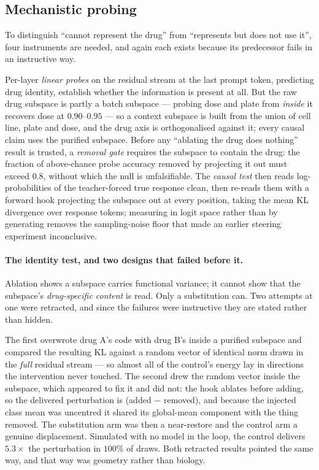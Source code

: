 \subsection{Mechanistic probing}
\label{sec:methods-probe}

To distinguish ``cannot represent the drug'' from ``represents but does not use it'', four
instruments are needed, and again each exists because its predecessor fails in an instructive way.

Per-layer \emph{linear probes} on the residual stream at the last prompt token, predicting drug
identity, establish whether the information is present at all. But the raw drug subspace is partly
a batch subspace --- probing dose and plate from \emph{inside} it recovers dose at $0.90$--$0.95$ ---
so a context subspace is built from the union of cell line, plate and dose, and the drug axis is
orthogonalised against it; every causal claim uses the purified subspace. Before any ``ablating the
drug does nothing'' result is trusted, a \emph{removal gate} requires the subspace to contain the
drug: the fraction of above-chance probe accuracy removed by projecting it out must exceed $0.8$,
without which the null is unfalsifiable. The \emph{causal test} then reads log-probabilities of the
teacher-forced true response clean, then re-reads them with a forward hook projecting the subspace
out at every position, taking the mean KL divergence over response tokens; measuring in logit space
rather than by generating removes the sampling-noise floor that made an earlier steering experiment
inconclusive.

\paragraph{The identity test, and two designs that failed before it.} Ablation shows a subspace
carries functional variance; it cannot show that the subspace's \emph{drug-specific content} is read.
Only a substitution can. Two attempts at one were retracted, and since the failures were instructive
they are stated rather than hidden.

The first overwrote drug A's code with drug B's inside a purified subspace and compared the resulting
KL against a random vector of identical norm drawn in the \emph{full} residual stream --- so almost
all of the control's energy lay in directions the intervention never touched. The second drew the
random vector inside the subspace, which appeared to fix it and did not: the hook ablates before
adding, so the delivered perturbation is (added $-$ removed), and because the injected class mean was
uncentred it shared its global-mean component with the thing removed. The substitution arm was then
a near-restore and the control arm a genuine displacement. Simulated with no model in the loop, the
control delivers $5.3\times$ the perturbation in $100\%$ of draws. Both retracted results pointed the
same way, and that way was geometry rather than biology.

